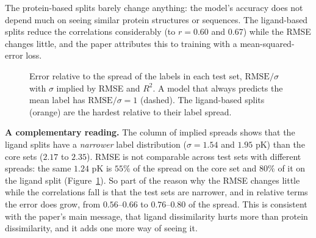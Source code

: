 \documentclass[11pt]{article}
\begin{document}
The protein-based splits barely change anything: the model's accuracy does not depend much on seeing similar protein structures or sequences. The ligand-based splits reduce the correlations considerably (to $r=0.60$ and $0.67$) while the RMSE changes little, and the paper attributes this to training with a mean-squared-error loss.

\begin{figure}[ht]
\centering
{}
\caption{Error relative to the spread of the labels in each test set, $\mathrm{RMSE}/\sigma$ with $\sigma$ implied by RMSE and $R^2$. A model that always predicts the mean label has $\mathrm{RMSE}/\sigma=1$ (dashed). The ligand-based splits (orange) are the hardest relative to their label spread.}
\label{fig:rel}
\end{figure}

\textbf{A complementary reading.} The column of implied spreads shows that the ligand splits have a \emph{narrower} label distribution ($\sigma=1.54$ and $1.95$ pK) than the core sets ($2.17$ to $2.35$). RMSE is not comparable across test sets with different spreads: the same $1.24$ pK is $55\%$ of the spread on the core set and $80\%$ of it on the ligand split (Figure~\ref{fig:rel}). So part of the reason why the RMSE changes little while the correlations fall is that the test sets are narrower, and in relative terms the error does grow, from $0.56$--$0.66$ to $0.76$--$0.80$ of the spread. This is consistent with the paper's main message, that ligand dissimilarity hurts more than protein dissimilarity, and it adds one more way of seeing it.
\end{document}
